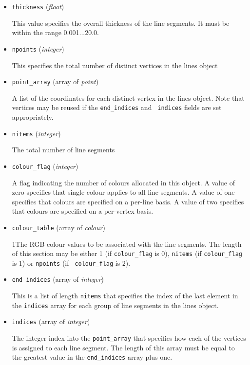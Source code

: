 \documentclass{article}
\newcommand{\kw}[1]{{\tt \mbox{#1}}}
\begin{document}
\begin{itemize}

\item \kw{thickness} ({\it float})

This value specifies the overall thickness of the line segments.  It
must be within the range 0.001...20.0.

\item \kw{npoints} ({\it integer})

This specifies the total number of distinct vertices in the lines object

\item \kw{point\_array} (array of {\it point})

A list of the coordinates for each distinct vertex in the lines object.
Note that vertices may be reused if the \kw{end\_indices} and \kw{
indices} fields are set appropriately.

\item \kw{nitems} ({\it integer})

The total number of line segments

\item \kw{colour\_flag} ({\it integer})

A flag indicating the number of colours allocated in this object.  A
value of zero specifies that single colour applies to all line segments.
A value of one specifies that colours are specified on a per-line basis.
A value of two specifies that colours are specified on a per-vertex basis.

\item \kw{colour\_table} (array of {\it colour})

1The RGB colour values to be associated with the line segments.  The
length of this section may be either 1 (if \kw{colour\_flag} is 0),
\kw{nitems} (if \kw{colour\_flag} is 1) or \kw{npoints} (if \kw{
colour\_flag} is 2).

\item \kw{end\_indices} (array of {\it integer})

This is a list of length \kw{nitems} that specifies the index of the
last element in the \kw{indices} array for each group of line segments
in the lines object.

\item \kw{indices} (array of {\it integer})

The integer index into the \kw{point\_array} that specifies how each of the
vertices is assigned to each line segment.  The length of this array must
be equal to the greatest value in the \kw{end\_indices} array plus one.

\end{itemize}
\end{document}
